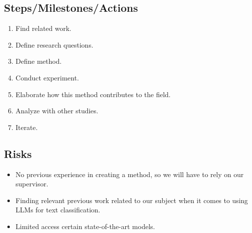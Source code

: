 \subsection{Steps/Milestones/Actions}

\begin{enumerate}
    \item Find related work.

    \item Define research questions.

    \item Define method.

    \item Conduct experiment.

    \item Elaborate how this method contributes to the field.

    \item Analyze with other studies.

    \item Iterate.
\end{enumerate}

\subsection{Risks}

\begin{itemize}
    \item No previous experience in creating a method, so we will have to rely
        on our supervisor.

    \item Finding relevant previous work related to our subject when it comes to
        using LLMs for text classification.

    \item Limited access certain state-of-the-art models.
\end{itemize}